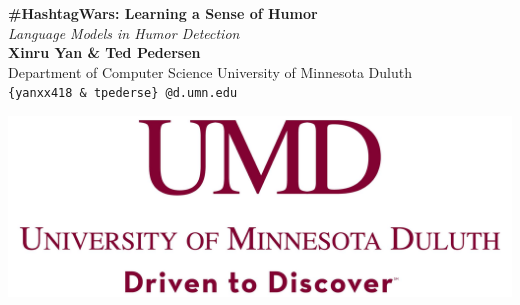 \documentclass[a0,portrait]{a0poster}
\begin{document}


\begin{minipage}[b]{0.75\linewidth}
\VeryHuge \color{NavyBlue} \textbf{\#HashtagWars: Learning a Sense of Humor} \color{Black}\\ %
\huge\textit{Language Models in Humor Detection}\\[2cm] %
\huge \textbf{Xinru Yan \& Ted Pedersen}\\[0.5cm] %
\huge Department of Computer Science University of Minnesota Duluth\\[0.4cm] %
\Large \texttt{\{yanxx418 \& tpederse\} @d.umn.edu}\\
\end{minipage}
%
\begin{minipage}[b]{0.25\linewidth}
\includegraphics[width=22cm]{logo.png}\\
\end{minipage}

\vspace{1cm} %

\end{document}
